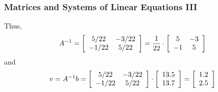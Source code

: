 \documentclass[xcolor=dvipsnames]{beamer}
\begin{document}
\begin{frame}
  \frametitle{Matrices and Systems of Linear Equations III}
Thus,
\begin{equation}
  \label{eq:oogeujie}
  A^{-1}=\left[\begin{array}{cc}
 5/22  & -3/22 \\
 -1/22 & 5/22
               \end{array}\right]=\frac{1}{22}\cdot\left[
               \begin{array}{cc}
                 5 & -3 \\
                 -1 & 5
               \end{array}\right]\notag
\end{equation}
and
\begin{equation}
  \label{eq:seeleeje}
  v=A^{-1}b=\left[\begin{array}{cc}
 5/22  & -3/22 \\
 -1/22 & 5/22
  \end{array}\right]\cdot
\left[\begin{array}{c}
 13.5   \\
 13.7  
  \end{array}\right]=\left[\begin{array}{c}
 1.2   \\
 2.5  
  \end{array}\right]\notag
\end{equation}
\end{frame}

\end{document}
